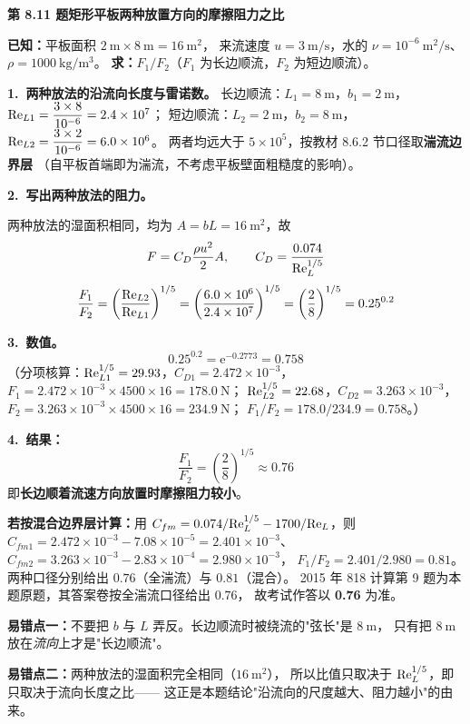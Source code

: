 \noindent\textbf{第 8.11 题\quad 矩形平板两种放置方向的摩擦阻力之比}

\begin{jie}
\textbf{已知：}平板面积 $2\ \mathrm{m}\times8\ \mathrm{m}=16\ \mathrm{m^2}$，
来流速度 $u=3\ \mathrm{m/s}$，水的 $\nu=10^{-6}\ \mathrm{m^2/s}$、$\rho=1000\ \mathrm{kg/m^3}$。
\textbf{求：}$F_1/F_2$（$F_1$ 为长边顺流，$F_2$ 为短边顺流）。

\textbf{1.\ 两种放法的沿流向长度与雷诺数。}
长边顺流：$L_1=8\ \mathrm{m}$，$b_1=2\ \mathrm{m}$，
$\mathrm{Re}_{L1}=\dfrac{3\times8}{10^{-6}}=2.4\times10^7$；
短边顺流：$L_2=2\ \mathrm{m}$，$b_2=8\ \mathrm{m}$，
$\mathrm{Re}_{L2}=\dfrac{3\times2}{10^{-6}}=6.0\times10^6$。
两者均远大于 $5\times10^5$，按教材 8.6.2 节口径取\textbf{湍流边界层}
（自平板首端即为湍流，不考虑平板壁面粗糙度的影响）。

\textbf{2.\ 写出两种放法的阻力。}

两种放法的湿面积相同，均为 $A=bL=16\ \mathrm{m^2}$，故
\[
F=C_D\frac{\rho u^2}{2}A,\qquad C_D=\frac{0.074}{\mathrm{Re}_L^{1/5}}
\]
\[
\frac{F_1}{F_2}=\left(\frac{\mathrm{Re}_{L2}}{\mathrm{Re}_{L1}}\right)^{1/5}
=\left(\frac{6.0\times10^6}{2.4\times10^7}\right)^{1/5}
=\left(\frac{2}{8}\right)^{1/5}=0.25^{0.2}
\]

\textbf{3.\ 数值。}
\[
0.25^{0.2}=\mathrm{e}^{-0.2773}=0.758
\]
（分项核算：$\mathrm{Re}_{L1}^{1/5}=29.93$，$C_{D1}=2.472\times10^{-3}$，
$F_1=2.472\times10^{-3}\times4500\times16=178.0\ \mathrm{N}$；
$\mathrm{Re}_{L2}^{1/5}=22.68$，$C_{D2}=3.263\times10^{-3}$，
$F_2=3.263\times10^{-3}\times4500\times16=234.9\ \mathrm{N}$；
$F_1/F_2=178.0/234.9=0.758$。）

\textbf{4.\ 结果：}
\[
\boxed{\,\frac{F_1}{F_2}=\left(\frac{2}{8}\right)^{1/5}\approx0.76\,}
\]
即\textbf{长边顺着流速方向放置时摩擦阻力较小}。
\end{jie}

\begin{tishi}
\textbf{若按混合边界层计算：}用 $C_{fm}=0.074/\mathrm{Re}_L^{1/5}-1700/\mathrm{Re}_L$，则
$C_{fm1}=2.472\times10^{-3}-7.08\times10^{-5}=2.401\times10^{-3}$、
$C_{fm2}=3.263\times10^{-3}-2.83\times10^{-4}=2.980\times10^{-3}$，
$F_1/F_2=2.401/2.980=0.81$。
两种口径分别给出 $0.76$（全湍流）与 $0.81$（混合）。
2015 年 818 计算第 9 题为本题原题，其答案卷按全湍流口径给出 $0.76$，
故考试作答以 \textbf{0.76} 为准。
\end{tishi}

\begin{yicuo}
\textbf{易错点一：}不要把 $b$ 与 $L$ 弄反。长边顺流时被绕流的"弦长"是 $8\ \mathrm{m}$，
只有把 $8\ \mathrm{m}$ 放在\emph{流向}上才是"长边顺流"。

\textbf{易错点二：}两种放法的湿面积完全相同（$16\ \mathrm{m^2}$），
所以比值只取决于 $\mathrm{Re}_L^{1/5}$，即只取决于流向长度之比——
这正是本题结论"沿流向的尺度越大、阻力越小"的由来。
\end{yicuo}


